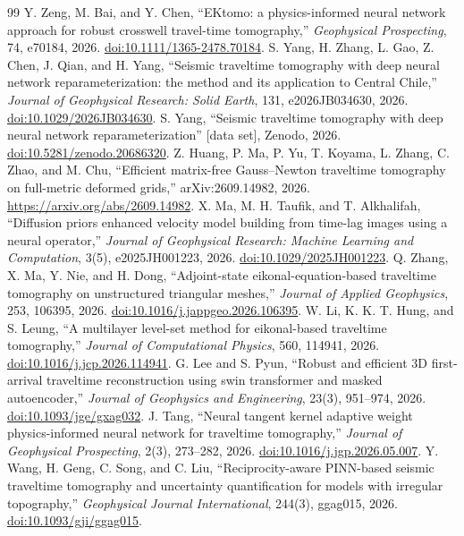 \documentclass[11pt]{article}
\begin{document}
\begin{thebibliography}{99}
 Y. Zeng, M. Bai, and Y. Chen, ``EKtomo: a physics-informed neural network approach for robust crosswell travel-time tomography,'' \emph{Geophysical Prospecting}, 74, e70184, 2026. \href{https://doi.org/10.1111/1365-2478.70184}{doi:10.1111/1365-2478.70184}.
 S. Yang, H. Zhang, L. Gao, Z. Chen, J. Qian, and H. Yang, ``Seismic traveltime tomography with deep neural network reparameterization: the method and its application to Central Chile,'' \emph{Journal of Geophysical Research: Solid Earth}, 131, e2026JB034630, 2026. \href{https://doi.org/10.1029/2026JB034630}{doi:10.1029/2026JB034630}.
 S. Yang, ``Seismic traveltime tomography with deep neural network reparameterization'' [data set], Zenodo, 2026. \href{https://doi.org/10.5281/zenodo.20686320}{doi:10.5281/zenodo.20686320}.
 Z. Huang, P. Ma, P. Yu, T. Koyama, L. Zhang, C. Zhao, and M. Chu, ``Efficient matrix-free Gauss--Newton traveltime tomography on full-metric deformed grids,'' arXiv:2609.14982, 2026. \url{https://arxiv.org/abs/2609.14982}.
 X. Ma, M. H. Taufik, and T. Alkhalifah, ``Diffusion priors enhanced velocity model building from time-lag images using a neural operator,'' \emph{Journal of Geophysical Research: Machine Learning and Computation}, 3(5), e2025JH001223, 2026. \href{https://doi.org/10.1029/2025JH001223}{doi:10.1029/2025JH001223}.
 Q. Zhang, X. Ma, Y. Nie, and H. Dong, ``Adjoint-state eikonal-equation-based traveltime tomography on unstructured triangular meshes,'' \emph{Journal of Applied Geophysics}, 253, 106395, 2026. \href{https://doi.org/10.1016/j.jappgeo.2026.106395}{doi:10.1016/j.jappgeo.2026.106395}.
 W. Li, K. K. T. Hung, and S. Leung, ``A multilayer level-set method for eikonal-based traveltime tomography,'' \emph{Journal of Computational Physics}, 560, 114941, 2026. \href{https://doi.org/10.1016/j.jcp.2026.114941}{doi:10.1016/j.jcp.2026.114941}.
 G. Lee and S. Pyun, ``Robust and efficient 3D first-arrival traveltime reconstruction using swin transformer and masked autoencoder,'' \emph{Journal of Geophysics and Engineering}, 23(3), 951--974, 2026. \href{https://doi.org/10.1093/jge/gxag032}{doi:10.1093/jge/gxag032}.
 J. Tang, ``Neural tangent kernel adaptive weight physics-informed neural network for traveltime tomography,'' \emph{Journal of Geophysical Prospecting}, 2(3), 273--282, 2026. \href{https://doi.org/10.1016/j.jgp.2026.05.007}{doi:10.1016/j.jgp.2026.05.007}.
 Y. Wang, H. Geng, C. Song, and C. Liu, ``Reciprocity-aware PINN-based seismic traveltime tomography and uncertainty quantification for models with irregular topography,'' \emph{Geophysical Journal International}, 244(3), ggag015, 2026. \href{https://doi.org/10.1093/gji/ggag015}{doi:10.1093/gji/ggag015}.

\end{thebibliography}
\end{document}
